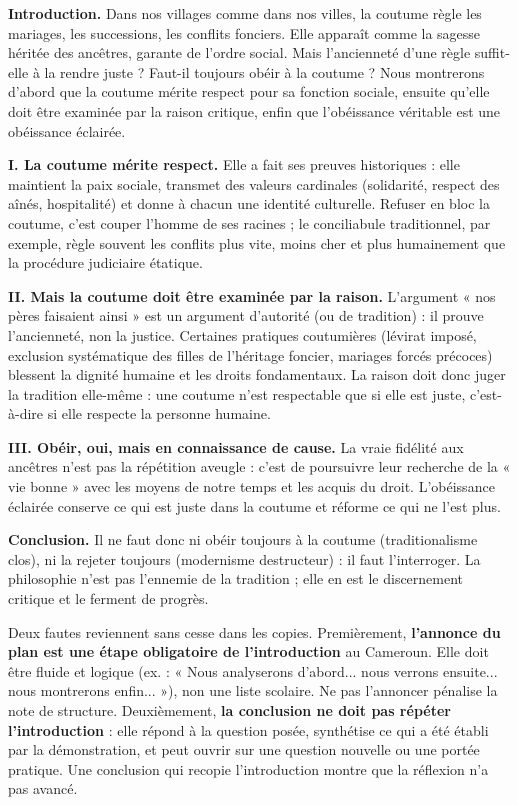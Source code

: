 \documentclass[11pt]{article}
\begin{document}
\begin{exemplebox}
\textbf{Introduction.} Dans nos villages comme dans nos villes, la coutume règle les mariages, les successions, les conflits fonciers. Elle apparaît comme la sagesse héritée des ancêtres, garante de l'ordre social. Mais l'ancienneté d'une règle suffit-elle à la rendre juste ? Faut-il toujours obéir à la coutume ? Nous montrerons d'abord que la coutume mérite respect pour sa fonction sociale, ensuite qu'elle doit être examinée par la raison critique, enfin que l'obéissance véritable est une obéissance éclairée.

\textbf{I. La coutume mérite respect.} Elle a fait ses preuves historiques : elle maintient la paix sociale, transmet des valeurs cardinales (solidarité, respect des aînés, hospitalité) et donne à chacun une identité culturelle. Refuser en bloc la coutume, c'est couper l'homme de ses racines ; le conciliabule traditionnel, par exemple, règle souvent les conflits plus vite, moins cher et plus humainement que la procédure judiciaire étatique.

\textbf{II. Mais la coutume doit être examinée par la raison.} L'argument « nos pères faisaient ainsi » est un argument d'autorité (ou de tradition) : il prouve l'ancienneté, non la justice. Certaines pratiques coutumières (lévirat imposé, exclusion systématique des filles de l'héritage foncier, mariages forcés précoces) blessent la dignité humaine et les droits fondamentaux. La raison doit donc juger la tradition elle-même : une coutume n'est respectable que si elle est juste, c'est-à-dire si elle respecte la personne humaine.

\textbf{III. Obéir, oui, mais en connaissance de cause.} La vraie fidélité aux ancêtres n'est pas la répétition aveugle : c'est de poursuivre leur recherche de la « vie bonne » avec les moyens de notre temps et les acquis du droit. L'obéissance éclairée conserve ce qui est juste dans la coutume et réforme ce qui ne l'est plus.

\textbf{Conclusion.} Il ne faut donc ni obéir toujours à la coutume (traditionalisme clos), ni la rejeter toujours (modernisme destructeur) : il faut l'interroger. La philosophie n'est pas l'ennemie de la tradition ; elle en est le discernement critique et le ferment de progrès.
\end{exemplebox}

\begin{attention}
Deux fautes reviennent sans cesse dans les copies. Premièrement, \textbf{l'annonce du plan est une étape obligatoire de l'introduction} au Cameroun. Elle doit être fluide et logique (ex. : « Nous analyserons d'abord... nous verrons ensuite... nous montrerons enfin... »), non une liste scolaire. Ne pas l'annoncer pénalise la note de structure. Deuxièmement, \textbf{la conclusion ne doit pas répéter l'introduction} : elle répond à la question posée, synthétise ce qui a été établi par la démonstration, et peut ouvrir sur une question nouvelle ou une portée pratique. Une conclusion qui recopie l'introduction montre que la réflexion n'a pas avancé.
\end{attention}
\end{document}
